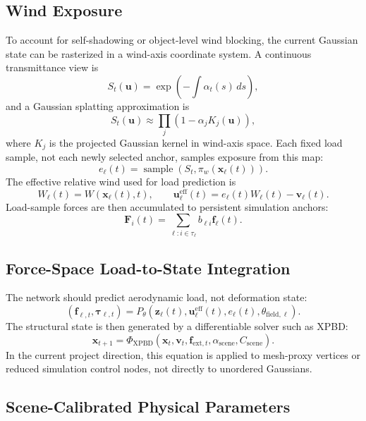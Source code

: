 \documentclass[11pt]{article}
\begin{document}
\subsection{Wind Exposure}

To account for self-shadowing or object-level wind blocking, the current Gaussian state can be rasterized in a wind-axis coordinate system. A continuous transmittance view is
\[
  S_t(\mathbf{u})
  =
  \exp\left(-\int \alpha_t(s)\,ds\right),
\]
and a Gaussian splatting approximation is
\[
  S_t(\mathbf{u})
  \approx
  \prod_j \left(1-\alpha_j K_j(\mathbf{u})\right),
\]
where \(K_j\) is the projected Gaussian kernel in wind-axis space. Each fixed load sample, not each newly selected anchor, samples exposure from this map:
\[
  e_\ell(t)=\operatorname{sample}\left(S_t,\pi_w(\mathbf{x}_\ell(t))\right).
\]
The effective relative wind used for load prediction is
\[
  W_\ell(t)=W(\mathbf{x}_\ell(t),t),
  \qquad
  \mathbf{u}^{\mathrm{eff}}_\ell(t)=e_\ell(t)W_\ell(t)-\mathbf{v}_\ell(t).
\]
Load-sample forces are then accumulated to persistent simulation anchors:
\[
  \mathbf{F}_i(t)
  =
  \sum_{\ell:i\in \tau_\ell}
  b_{\ell i}\mathbf{f}_\ell(t).
\]

\subsection{Force-Space Load-to-State Integration}

The network should predict aerodynamic load, not deformation state:
\[
  (\mathbf{f}_{\ell,t},\boldsymbol{\tau}_{\ell,t})
  =
  P_\theta\left(\mathbf{z}_\ell(t),
  \mathbf{u}^{\mathrm{eff}}_\ell(t),
  e_\ell(t),
  \theta_{\mathrm{field},\ell}\right).
\]
The structural state is then generated by a differentiable solver such as XPBD:
\[
  \mathbf{x}_{t+1}
  =
  \Phi_{\mathrm{XPBD}}
  \left(
    \mathbf{x}_t,
    \mathbf{v}_t,
    \mathbf{f}_{\mathrm{ext},t},
    \alpha_{\mathrm{scene}},
    C_{\mathrm{scene}}
  \right).
\]
In the current project direction, this equation is applied to mesh-proxy vertices or reduced simulation control nodes, not directly to unordered Gaussians.

\subsection{Scene-Calibrated Physical Parameters}
\end{document}
